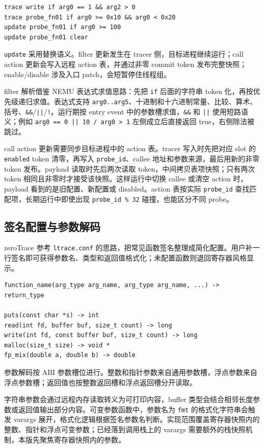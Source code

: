 \documentclass[UTF8,a4paper,11pt,fontset=fandol]{ctexart}
\newcommand{\code}[1]{\texttt{#1}}
\begin{document}
\begin{lstlisting}
trace write if arg0 == 1 && arg2 > 0
trace probe_fn01 if arg0 >= 0x10 && arg0 < 0x20
update probe_fn01 if arg0 >= 100
update probe_fn01 clear
\end{lstlisting}

\code{update} 采用替换语义。filter 更新发生在 tracer 侧，目标进程继续运行；call action 更新会写入远程 action 表，并通过非零 commit token 发布完整快照；enable/disable 涉及入口 patch，会短暂停住线程组。

filter 解析借鉴 NEMU 表达式求值思路：先把 \code{if} 后面的字符串 token 化，再按优先级递归求值。表达式支持 \code{arg0..arg5}、十进制和十六进制常量、比较、算术、括号、\code{\&\&}/\code{||}/\code{!}。运行期按 entry event 中的参数槽求值，\code{\&\&} 和 \code{||} 使用短路语义；例如 \code{arg0 == 0 || 10 / arg0 > 1} 左侧成立后直接返回 true，右侧除法被跳过。

call action 更新需要同步目标进程中的 action 表。tracer 写入时先把对应 slot 的 \code{enabled} token 清零，再写入 \code{probe\_id}、callee 地址和参数来源，最后用新的非零 token 发布。payload 读取时先后两次读取 token，中间拷贝表项快照；只有两次 token 相同且非零时才接受该快照。这样运行中切换 callee 或清空 action 时，payload 看到的是旧配置、新配置或 disabled。action 表按实际 \code{probe\_id} 查找匹配项，长期运行中即使出现 \code{probe\_id \% 32} 碰撞，也能区分不同 probe。

\subsection{签名配置与参数解码}

zeroTrace 参考 \code{ltrace.conf} 的思路，把常见函数签名整理成简化配置。用户补一行签名即可获得参数名、类型和返回值格式化；未配置函数则退回寄存器风格显示。

\begin{lstlisting}
function_name(arg_type arg_name, arg_type arg_name, ...) -> return_type

puts(const char *s) -> int
read(int fd, buffer buf, size_t count) -> long
write(int fd, const buffer buf, size_t count) -> long
malloc(size_t size) -> void *
fp_mix(double a, double b) -> double
\end{lstlisting}

参数解码按 ABI 参数槽位进行。整数和指针参数来自通用参数槽，浮点参数来自浮点参数槽；返回值也按整数返回槽和浮点返回槽分开读取。

字符串参数会通过远程内存读取转义为可打印内容，buffer 类型会结合相邻长度参数或返回值输出部分内容。可变参数函数中，参数名为 \code{fmt} 的格式化字符串会触发 varargs 展开，格式化逻辑根据签名参数名判断。实现范围覆盖寄存器快照内的整数、指针和浮点可变参数；已经落到调用栈上的 varargs 需要额外的栈快照机制，本版先聚焦寄存器快照内的参数。
\end{document}
